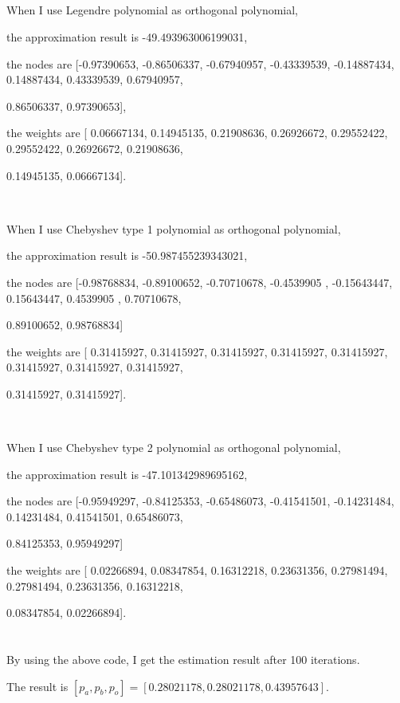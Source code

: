 \documentclass{article}
\begin{document}
	\subsection{}
		When I use Legendre polynomial as orthogonal polynomial, 
		\par
		the approximation result is -49.493963006199031,
		\par
		the nodes are [-0.97390653, -0.86506337, -0.67940957, -0.43339539, -0.14887434,
         0.14887434,  0.43339539,  0.67940957, \par 0.86506337,  0.97390653],\par
		the weights are [ 0.06667134,  0.14945135,  0.21908636,  0.26926672,  0.29552422,
         0.29552422,  0.26926672,  0.21908636, \par 0.14945135,  0.06667134].
		\par
		\ 
		\par
		When I use Chebyshev type 1 polynomial as orthogonal polynomial, 
		\par
		the approximation result is -50.987455239343021,
		\par
		the nodes are [-0.98768834, -0.89100652, -0.70710678, -0.4539905 , -0.15643447,
         0.15643447,  0.4539905 ,  0.70710678, \par 0.89100652,  0.98768834]\par
		the weights are [ 0.31415927,  0.31415927,  0.31415927,  0.31415927,  0.31415927,
         0.31415927,  0.31415927,  0.31415927, \par 0.31415927,  0.31415927].
		\par
		\ 
		\par
		When I use Chebyshev type 2 polynomial as orthogonal polynomial, 
		\par
		the approximation result is -47.101342989695162,
		\par
		the nodes are [-0.95949297, -0.84125353, -0.65486073, -0.41541501, -0.14231484,
         0.14231484,  0.41541501,  0.65486073, \par 0.84125353,  0.95949297]\par
		the weights are [ 0.02266894,  0.08347854,  0.16312218,  0.23631356,  0.27981494,
         0.27981494,  0.23631356,  0.16312218, \par 0.08347854,  0.02266894].
\section{}
	
	\subsection{}
	
	\subsection{}
	By using the above code, I get the estimation result after 100 iterations. \par The result is $[p_a, p_b, p_o] = [ 0.28021178,  0.28021178,  0.43957643]$.
\section{}
	
\end{document}
